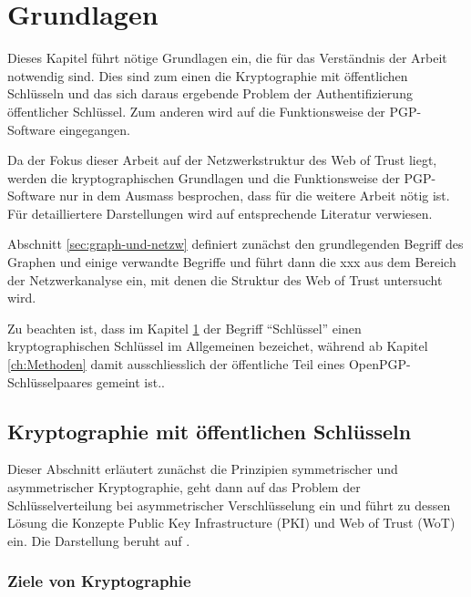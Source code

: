 
\chapter{Grundlagen}
\label{ch:Grundlagen}

Dieses Kapitel f\"uhrt n\"otige Grundlagen ein, die f\"ur das
Verst\"andnis der Arbeit notwendig sind. Dies sind zum einen die
Kryptographie mit \"offentlichen Schl\"usseln und das sich daraus
ergebende Problem der Authentifizierung \"offentlicher
Schl\"ussel. Zum anderen wird auf die Funktionsweise der PGP-Software
eingegangen.

Da der Fokus dieser Arbeit auf der Netzwerkstruktur des Web of Trust
liegt, werden die kryptographischen Grundlagen und die Funktionsweise
der PGP-Software nur in dem Ausmass besprochen, dass f\"ur die weitere
Arbeit n\"otig ist. F\"ur detailliertere Darstellungen wird auf
entsprechende Literatur verwiesen.

Abschnitt \ref{sec:graph-und-netzw} definiert zun\"achst den
grundlegenden Begriff des Graphen und einige verwandte Begriffe und
f\"uhrt dann die xxx aus dem Bereich der Netzwerkanalyse ein, mit
denen die Struktur des Web of Trust untersucht wird.

Zu beachten ist, dass im Kapitel \ref{ch:Grundlagen} der Begriff
``Schl\"ussel'' einen kryptographischen Schl\"ussel im Allgemeinen
bezeichet, w\"ahrend ab Kapitel \ref{ch:Methoden} damit
ausschliesslich der \"offentliche Teil eines OpenPGP-Schl\"usselpaares
gemeint ist..

\section{Kryptographie mit öffentlichen Schlüsseln}
\label{ch:Grundlagen:sec:PublicKeyCrypto}

Dieser Abschnitt erl\"autert zun\"achst die Prinzipien symmetrischer
und asymmetrischer Kryptographie, geht dann auf das Problem der
Schl\"usselverteilung bei asymmetrischer Verschl\"usselung ein und
f\"uhrt zu dessen L\"osung die Konzepte Public Key Infrastructure
(PKI) und Web of Trust (WoT) ein. Die Darstellung beruht auf
\cite{Menezes1996}.

\subsection{Ziele von Kryptographie}
\label{sec:ziele-von-krypt}

